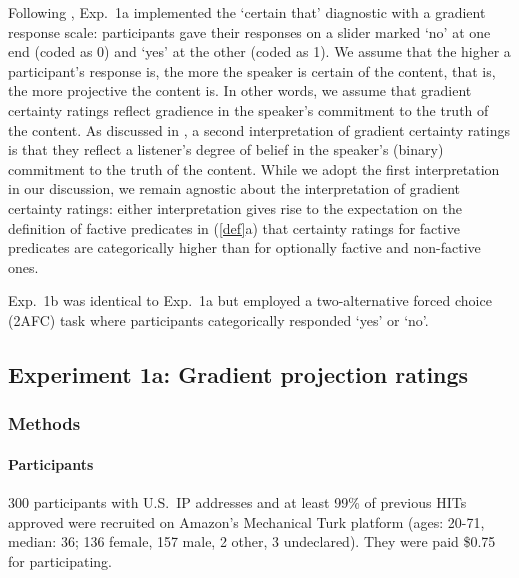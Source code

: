 \documentclass[11pt,fleqn]{article}
\newcommand{\6}{\mbox{$[\hspace*{-.6mm}[$}}
\newcommand{\9}{\mbox{$]\hspace*{-.6mm}]$}}
\begin{document}
Following \citealt{tbd-variability}, Exp.~1a implemented the `certain that' diagnostic with a gradient response scale: participants gave their responses on a slider marked `no' at one end (coded as 0) and `yes' at the other (coded as 1). We assume that the higher a participant's response is, the more the speaker is certain of the content, that is, the more projective the content is. In other words, we assume that gradient certainty ratings reflect gradience in the speaker's commitment to the truth of the content. As discussed in \citealt{tbd-variability}, a second interpretation of gradient certainty ratings is that they reflect a listener's degree of belief in the speaker's (binary) commitment to the truth of the content. While we adopt the first interpretation in our discussion, we remain agnostic about the interpretation of gradient certainty ratings: either interpretation gives rise to the expectation  on the definition of factive predicates in (\ref{def}a) that certainty ratings for factive predicates are categorically higher than for optionally factive and non-factive ones. 

Exp.~1b was identical to Exp.~1a but employed a two-alternative forced choice (2AFC) task where participants categorically responded `yes' or `no'.
 
\subsection{Experiment 1a: Gradient projection ratings}

\subsubsection{Methods}

\paragraph{Participants} 300 participants with U.S.\ IP addresses and at least 99\% of previous HITs approved were recruited on Amazon's Mechanical Turk platform (ages: 20-71, median: 36; 136 female, 157 male, 2 other, 3 undeclared). They were paid \$0.75 for participating.
\end{document}
